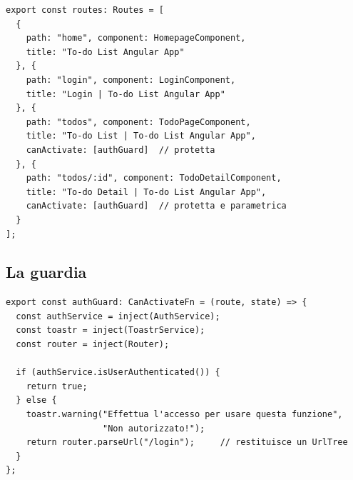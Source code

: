 \begin{affianco}[0.46][c]
\codicepiccolo
\begin{lstlisting}[style=ts, name=app.routes.ts]
export const routes: Routes = [
  {
    path: "home", component: HomepageComponent,
    title: "To-do List Angular App"
  }, {
    path: "login", component: LoginComponent,
    title: "Login | To-do List Angular App"
  }, {
    path: "todos", component: TodoPageComponent,
    title: "To-do List | To-do List Angular App",
    canActivate: [authGuard]  // protetta
  }, {
    path: "todos/:id", component: TodoDetailComponent,
    title: "To-do Detail | To-do List Angular App",
    canActivate: [authGuard]  // protetta e parametrica
  }
];
\end{lstlisting}
\risultato
\begin{immagine}
\end{immagine}
\end{affianco}

\subsection{La guardia}

\begin{affianco}[0.54][c]
\codicepiccolo
\begin{lstlisting}[style=ts, name=auth.guard.ts]
export const authGuard: CanActivateFn = (route, state) => {
  const authService = inject(AuthService);
  const toastr = inject(ToastrService);
  const router = inject(Router);

  if (authService.isUserAuthenticated()) {
    return true;
  } else {
    toastr.warning("Effettua l'accesso per usare questa funzione",
                   "Non autorizzato!");
    return router.parseUrl("/login");     // restituisce un UrlTree
  }
};
\end{lstlisting}
\risultato
\begin{immagine}
\end{immagine}
\end{affianco}

